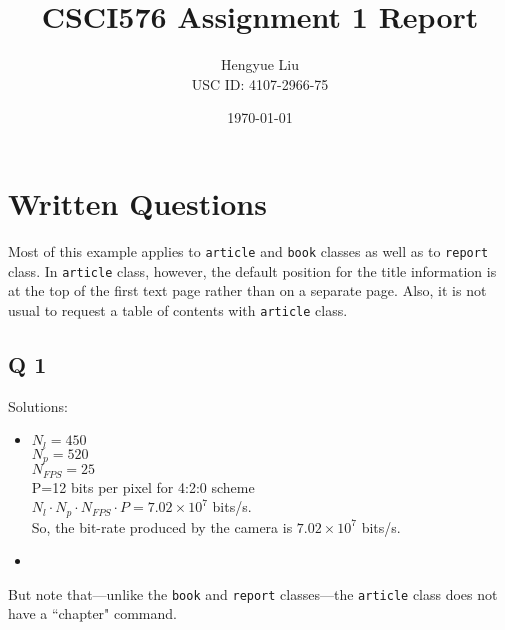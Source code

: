 \documentclass[10pt]{report}            %
\title{\bf CSCI576 Assignment 1 Report}  %
\author{Hengyue Liu\\USC ID: 4107-2966-75}              %
\date{\today}                           %
\begin{document}
\maketitle                              %
\setcounter{page}{2}                    %
\tableofcontents                        %
\renewcommand{\chaptername}{Part}
\chapter{Written Questions}                %
Most of this example applies to \texttt{article} and \texttt{book} classes
as well as to \texttt{report} class. In \texttt{article} class, however,
the default position for the title information is at the top of
the first text page rather than on a separate page. Also, it is
not usual to request a table of contents with \texttt{article} class.
 
\section*{Q 1}                  %
Solutions:
\begin{itemize}
\item                           %
 $N_{l}=450$\\                                %
 $N_{p}=520$\\
 $N_{FPS}=25$\\ 
 P=12 bits per pixel for 4:2:0 scheme\\
 $N_l \cdot N_p \cdot N_{FPS} \cdot P = 7.02\times10^7$ bits/s.\\
 So, the bit-rate produced by the camera is $7.02\times10^7$ bits/s.\\
\item

 \end{itemize}   
But note that---unlike the \texttt{book} and \texttt{report} classes---the
\texttt{article} class does not have a ``chapter" command.
 
\end{document}
